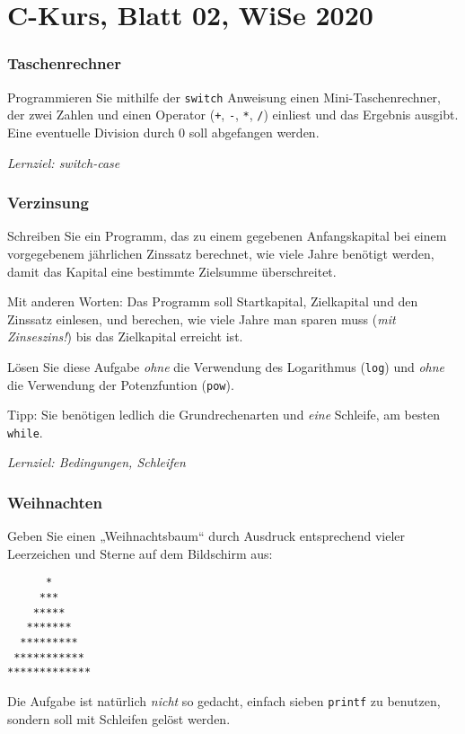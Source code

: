 \documentclass[
	ngerman,
	fontsize=10pt,
	parskip=half,
	titlepage=true,
	DIV=12
]{scrartcl}
\begin{document}
\part*{C-Kurs, Blatt 02, WiSe 2020}


\section{Taschenrechner}

Programmieren Sie mithilfe der \texttt{switch} Anweisung einen Mini-Taschenrechner,
der zwei Zahlen und einen Operator (\texttt{+}, \texttt{-}, \texttt{*}, \texttt{/})
einliest und das Ergebnis ausgibt.
Eine eventuelle Division durch 0 soll abgefangen werden.

\emph{Lernziel: switch-case}

\section{Verzinsung}

Schreiben Sie ein Programm, das zu einem gegebenen Anfangskapital
bei einem vorgegebenem jährlichen Zinssatz berechnet,
wie viele Jahre benötigt werden, damit das Kapital eine 
bestimmte Zielsumme überschreitet. 

Mit anderen Worten: Das Programm soll Startkapital, Zielkapital
und den Zinssatz einlesen, und berechen, wie viele Jahre man sparen muss
(\emph{mit Zinseszins!}) bis das Zielkapital erreicht ist.

Lösen Sie diese Aufgabe \emph{ohne} die Verwendung
des Logarithmus (\texttt{log}) und \emph{ohne} die Verwendung
der Potenzfuntion (\texttt{pow}). 

Tipp: Sie benötigen ledlich die Grundrechenarten und \emph{eine} Schleife, am besten \texttt{while}.

{\em Lernziel: Bedingungen, Schleifen}


\section{Weihnachten}

Geben Sie einen „Weihnachtsbaum“ durch Ausdruck entsprechend vieler
Leerzeichen und Sterne auf dem Bildschirm aus:

\begin{verbatim}
      *
     ***
    *****
   *******
  *********
 ***********
*************
\end{verbatim}

Die Aufgabe ist natürlich \emph{nicht} so gedacht, einfach sieben \texttt{printf} zu benutzen, sondern soll mit Schleifen gelöst werden.
\end{document}
